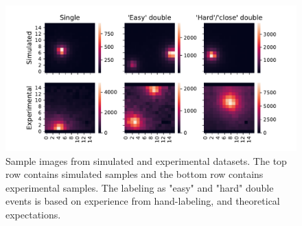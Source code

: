 \begin{figure}
    \centering
    \includegraphics[width=\textwidth]{chapters/theory/figures/detector_image_samples.pdf}
    \caption{\label{fig:exp-background-sample-images} Sample images from 
    simulated and experimental datasets. The top row contains simulated samples
    and the bottom row contains experimental samples. The labeling as "easy" and "hard"
    double events is based on experience from hand-labeling, and theoretical
    expectations.}
\end{figure}